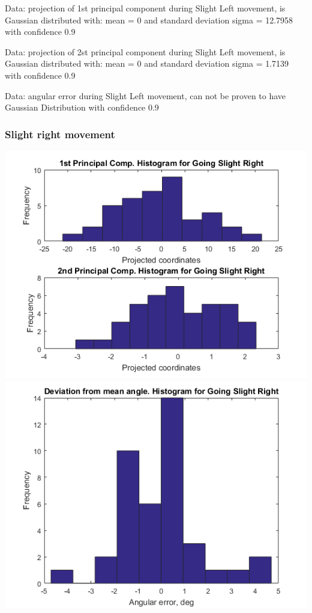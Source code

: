 \documentclass[a4paper, 12pt]{article}
\begin{document}
Data: projection of 1st principal component during  Slight Left movement, is Gaussian distributed with: mean = 0 and standard deviation sigma = 12.7958 with confidence 0.9%



\smallskip

Data: projection of 2st principal component during  Slight Left movement, is Gaussian distributed with: mean = 0 and standard deviation sigma = 1.7139 with confidence 0.9%



\smallskip


Data:  angular error during   Slight Left movement, can not be proven to have Gaussian Distribution with confidence 0.9%
\newpage
\subsubsection{Slight right movement}

\begin{center}

  \includegraphics[scale=0.6]{r2}
  \includegraphics[scale=0.6]{r3}
\end{center}
\end{document}
